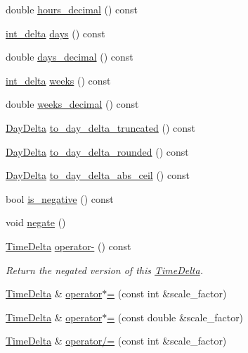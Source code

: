 \begin{DoxyCompactItemize}
double \hyperlink{structTimeDelta_aaae58342e9d06c7c78e9b5dea5cafe02}{hours\-\_\-decimal} () const 
\item 
\hyperlink{types_8h_a8a67cf99971c5cfeeaa2380ba84a4c92}{int\-\_\-delta} \hyperlink{structTimeDelta_abad8a94a6c022af1a1871e452eca47ea}{days} () const 
\item 
double \hyperlink{structTimeDelta_aa73d3724b83ed4badb44b714d86124a2}{days\-\_\-decimal} () const 
\item 
\hyperlink{types_8h_a8a67cf99971c5cfeeaa2380ba84a4c92}{int\-\_\-delta} \hyperlink{structTimeDelta_a4e583a79abea664691df4680f4fd467d}{weeks} () const 
\item 
double \hyperlink{structTimeDelta_a11ca76e0cb990c9011a0ed91cda9ff8e}{weeks\-\_\-decimal} () const 
\item 
\hyperlink{structDayDelta}{\-Day\-Delta} \hyperlink{structTimeDelta_a88d9627af17ac4b73f55519f2b946b00}{to\-\_\-day\-\_\-delta\-\_\-truncated} () const 
\item 
\hyperlink{structDayDelta}{\-Day\-Delta} \hyperlink{structTimeDelta_afa0e46a4d595192d5d7d678e40b7dd94}{to\-\_\-day\-\_\-delta\-\_\-rounded} () const 
\item 
\hyperlink{structDayDelta}{\-Day\-Delta} \hyperlink{structTimeDelta_a30ac36cdf088ca418f8a11b143086b73}{to\-\_\-day\-\_\-delta\-\_\-abs\-\_\-ceil} () const 
\item 
bool \hyperlink{structTimeDelta_acc2faf0e9a1563c84fb68cad42521c54}{is\-\_\-negative} () const 
\item 
void \hyperlink{structTimeDelta_a858c8d0eae6070a24ba7fd3e18a3cf3f}{negate} ()
\item 
\hyperlink{structTimeDelta}{\-Time\-Delta} \hyperlink{structTimeDelta_a660df6f5ba7291bef24d5a05639563b6}{operator-\/} () const 
\begin{DoxyCompactList}\small\item\em \-Return the negated version of this \hyperlink{structTimeDelta}{\-Time\-Delta}. \end{DoxyCompactList}\item 
\hyperlink{structTimeDelta}{\-Time\-Delta} \& \hyperlink{structTimeDelta_aa1417029a51a1e2e7cf20445ad6cfa01}{operator$\ast$=} (const int \&scale\-\_\-factor)
\item 
\hyperlink{structTimeDelta}{\-Time\-Delta} \& \hyperlink{structTimeDelta_a8301b98264ca9539a160a756e4014559}{operator$\ast$=} (const double \&scale\-\_\-factor)
\item 
\hyperlink{structTimeDelta}{\-Time\-Delta} \& \hyperlink{structTimeDelta_ac3180211824572ea2f198ca1ad6887c9}{operator/=} (const int \&scale\-\_\-factor)

\end{DoxyCompactItemize}
